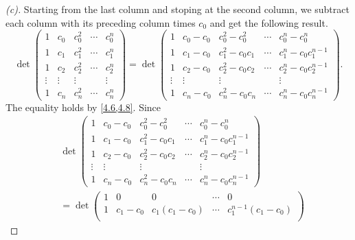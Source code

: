 \begin{proof}[(c)]
  Starting from the last column and stoping at the second column, we subtract each column with its preceding column times \(c_0\) and get the following result.
  \[
    \det\begin{pmatrix}
      1      & c_0    & c_0^2  & \cdots & c_0^n  \\
      1      & c_1    & c_1^2  & \cdots & c_1^n  \\
      1      & c_2    & c_2^2  & \cdots & c_2^n  \\
      \vdots & \vdots & \vdots &        & \vdots \\
      1      & c_n    & c_n^2  & \cdots & c_n^n
    \end{pmatrix} = \det\begin{pmatrix}
      1      & c_0 - c_0 & c_0^2 - c_0^2   & \cdots & c_0^n - c_0^n           \\
      1      & c_1 - c_0 & c_1^2 - c_0 c_1 & \cdots & c_1^n - c_0 c_1^{n - 1} \\
      1      & c_2 - c_0 & c_2^2 - c_0 c_2 & \cdots & c_2^n - c_0 c_2^{n - 1} \\
      \vdots & \vdots    & \vdots          &        & \vdots                  \\
      1      & c_n - c_0 & c_n^2 - c_0 c_n & \cdots & c_n^n - c_0 c_n^{n - 1}
    \end{pmatrix}.
  \]
  The equality holds by \cref{4.6,4.8}.
  Since
  \begin{align*}
     & \det\begin{pmatrix}
             1      & c_0 - c_0 & c_0^2 - c_0^2   & \cdots & c_0^n - c_0^n           \\
             1      & c_1 - c_0 & c_1^2 - c_0 c_1 & \cdots & c_1^n - c_0 c_1^{n - 1} \\
             1      & c_2 - c_0 & c_2^2 - c_0 c_2 & \cdots & c_2^n - c_0 c_2^{n - 1} \\
             \vdots & \vdots    & \vdots          &        & \vdots                  \\
             1      & c_n - c_0 & c_n^2 - c_0 c_n & \cdots & c_n^n - c_0 c_n^{n - 1}
           \end{pmatrix}             \\
     & = \det\begin{pmatrix}
               1      & 0         & 0               & \cdots & 0                       \\
               1      & c_1 - c_0 & c_1 (c_1 - c_0) & \cdots & c_1^{n - 1} (c_1 - c_0) \\

\end{pmatrix}
\end{align*}
\end{proof}

